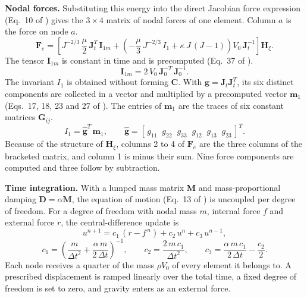 \documentclass[11pt,a4paper]{article}
\newcommand{\Jm}{J^{-2/3}}
\newcommand{\mat}[1]{\mathbf{#1}}
\begin{document}
\textbf{Nodal forces.} Substituting this energy into the direct Jacobian force expression (Eq.~10 of \cite{zhang2021}) gives the $3\times4$ matrix of nodal forces of one element. Column $a$ is the force on node $a$.
\begin{equation}
\label{eq:force}
\mat{F}_e = \left[ \Jm\,\frac{\mu}{2}\,\mat{J}_t^{T}\,\mat{I}_{1m} + \left( -\frac{\mu}{3}\,\Jm\,I_1 + \kappa\,J\,(J-1) \right) V_0\,\mat{J}_t^{-1} \right] \mat{H}_{\xi}.
\end{equation}
The tensor $\mat{I}_{1m}$ is constant in time and is precomputed (Eq.~37 of \cite{zhang2021}).
\begin{equation}
\mat{I}_{1m} = 2\,V_0\,\mat{J}_0^{-T}\,\mat{J}_0^{-1}.
\end{equation}
The invariant $I_1$ is obtained without forming $\mat{C}$. With $\mat{g} = \mat{J}_t\mat{J}_t^{T}$, its six distinct components are collected in a vector and multiplied by a precomputed vector $\mat{m}_1$ (Eqs.~17, 18, 23 and 27 of \cite{zhang2021}). The entries of $\mat{m}_1$ are the traces of six constant matrices $\mat{G}_{ij}$.
\begin{equation}
\label{eq:I1}
I_1 = \hat{\mat{g}}^{T}\,\mat{m}_1, \qquad \hat{\mat{g}} = \left[\, g_{11}\;\; g_{22}\;\; g_{33}\;\; g_{12}\;\; g_{13}\;\; g_{23} \,\right]^{T}.
\end{equation}
Because of the structure of $\mat{H}_{\xi}$, columns 2 to 4 of $\mat{F}_e$ are the three columns of the bracketed matrix, and column 1 is minus their sum. Nine force components are computed and three follow by subtraction.

\textbf{Time integration.} With a lumped mass matrix $\mat{M}$ and mass-proportional damping $\mat{D} = \alpha\mat{M}$, the equation of motion (Eq.~13 of \cite{zhang2021}) is uncoupled per degree of freedom. For a degree of freedom with nodal mass $m$, internal force $f$ and external force $r$, the central-difference update is
\begin{equation}
\label{eq:update}
u^{n+1} = c_1\,(r - f^{\,n}) + c_2\,u^{n} + c_3\,u^{n-1},
\end{equation}
\begin{equation}
c_1 = \left( \frac{m}{\Delta t^2} + \frac{\alpha\,m}{2\,\Delta t} \right)^{-1}, \qquad c_2 = \frac{2\,m\,c_1}{\Delta t^2}, \qquad c_3 = \frac{\alpha\,m\,c_1}{2\,\Delta t} - \frac{c_2}{2}.
\end{equation}
Each node receives a quarter of the mass $\rho V_0$ of every element it belongs to. A prescribed displacement is ramped linearly over the total time, a fixed degree of freedom is set to zero, and gravity enters as an external force.
\end{document}
